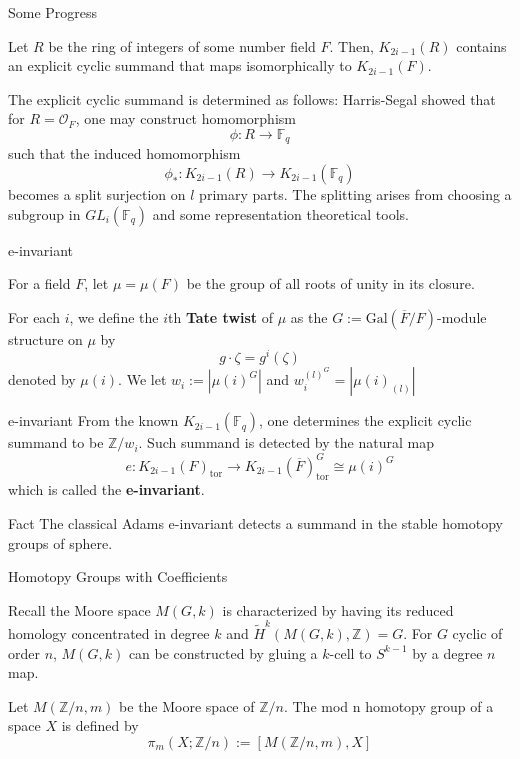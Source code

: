 \documentclass{beamer}
\begin{document}
\begin{frame}{Some Progress}
\begin{theorem}
Let $R$ be the ring of integers of some number field $F$. Then, $K_{2i-1}(R)$ contains an explicit cyclic summand that maps isomorphically to $K_{2i-1}(F)$. 
\end{theorem}
The explicit cyclic summand is determined as follows: Harris-Segal showed that for $R=\mathcal{O}_F$, one may construct homomorphism
\[\phi: R\to \mathbb{F}_q\]
such that the induced homomorphism
\[\phi_*: K_{2i-1}(R)\to K_{2i-1}(\mathbb{F}_q)\]
becomes a split surjection on $l$ primary parts. The splitting arises from choosing a subgroup in $GL_i(\mathbb{F}_q)$ and some representation theoretical tools.

\end{frame}
\begin{frame}{e-invariant}


For a field $F$, let $\mu=\mu(F)$ be the group of all roots of unity in its closure.

\begin{definition}
 For each $i$, we define the $i$th \textbf{Tate twist} of $\mu$ as the $G:=\textrm{Gal}(\overline{F}/F)$-module structure on $\mu$ by 
  \[g\cdot \zeta=g^i(\zeta)\]
denoted by $\mu(i)$. We let $w_i:= |\mu(i)^G|$ and $w_i^{(l)^G}=|\mu(i)_{(l)}|$
\end{definition}
\end{frame}


\begin{frame}{e-invariant}
From the known $K_{2i-1}(\mathbb{F}_q)$, one determines the explicit cyclic summand to be $\mathbb{Z}/w_i$. Such summand is detected by the natural map 
\[e: K_{2i-1}(F)_{\textrm{tor}}\to K_{2i-1}(\overline{F})_{\textrm{tor}}^G\cong \mu(i)^G \]
which is called the \textbf{e-invariant}.

\begin{block}{Fact}
The classical Adams e-invariant detects a summand in the stable homotopy groups of sphere.
  
\end{block}



\end{frame}







\begin{frame}[fragile]{Homotopy Groups with Coefficients}
  
Recall the Moore space $M(G,k)$ is characterized by having its reduced homology concentrated in degree $k$ and $\tilde{H}^k(M(G,k), \mathbb{Z})=G$. For $G$ cyclic of order $n$, $M(G,k)$ can be constructed by gluing a $k$-cell to $S^{k-1}$ by a degree $n$ map. \pause
\begin{definition}
  Let $M(\mathbb{Z}/n,m)$ be the Moore space of $\mathbb{Z}/n$. The mod n homotopy group of a space $X$ is defined by 
\[ \pi_m(X; \mathbb{Z}/n):= [M(\mathbb{Z}/n,m), X]\]
\end{definition}

\end{frame}
\end{document}
